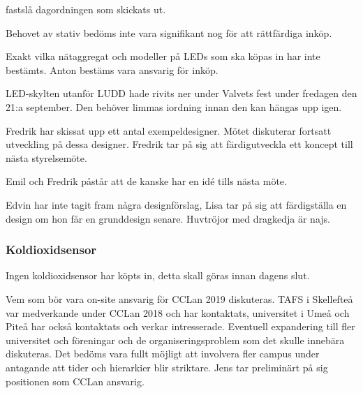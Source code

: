 \documentclass{protokoll}
\begin{document}
\newpage  


\begin{beslut}
     \att fastslå dagordningen som skickats ut.
\end{beslut}

Behovet av stativ bedöms inte vara signifikant nog för att rättfärdiga inköp. 

Exakt vilka nätaggregat och modeller på LEDs som ska köpas in har inte bestämts. Anton bestäms vara ansvarig för inköp.

LED-skylten utanför LUDD hade rivits ner under Valvets fest under fredagen den 21:a september. Den behöver limmas iordning innan den kan hängas upp igen.

Fredrik har skissat upp ett antal exempeldesigner. Mötet diskuterar fortsatt utveckling på dessa designer. Fredrik tar på sig att färdigutveckla ett koncept till nästa styrelsemöte.

Emil och Fredrik påstår att de kanske har en idé tills nästa möte.

Edvin har inte tagit fram några designförslag, Lisa tar på sig att färdigställa en design om hon får en grunddesign senare. Huvtröjor med dragkedja är najs.

\subsubsection{Koldioxidsensor}
Ingen koldioxidsensor har köpts in, detta skall göras innan dagens slut.

Vem som bör vara on-site ansvarig för CCLan 2019 diskuteras. 
TAFS i Skellefteå var medverkande under CCLan 2018 och har kontaktats, universitet i Umeå och Piteå har också kontaktats och verkar intresserade. 
Eventuell expandering till fler universitet och föreningar och de organiseringsproblem som det skulle innebära diskuteras. Det bedöms vara fullt möjligt att involvera fler campus under antagande att tider och hierarkier blir striktare. 
Jens tar preliminärt på sig positionen som CCLan ansvarig. %
\end{document}
